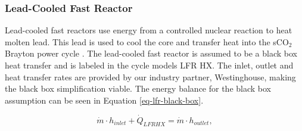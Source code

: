 

\subsubsection{Lead-Cooled Fast Reactor}
Lead-cooled fast reactors use energy from a controlled nuclear reaction to heat molten lead. This lead is used to cool the core and transfer heat into the sCO$_2$ Brayton power cycle \cite{smith_2016_lfr_background,alemberti_2013_lfr_overview}. The lead-cooled fast reactor is assumed to be a black box heat transfer and is labeled in the cycle models LFR HX. The inlet, outlet and heat transfer rates are provided by our industry partner, Westinghouse, making the black box simplification viable. The energy balance for the black box assumption can be seen in Equation \ref{eq-lfr-black-box}.

\begin{equation}
    \label{eq-lfr-black-box}
    \dot{m} \cdot h_{inlet} + \dot{Q}_{LFRHX} = \dot{m} \cdot h_{outlet},
\end{equation}

